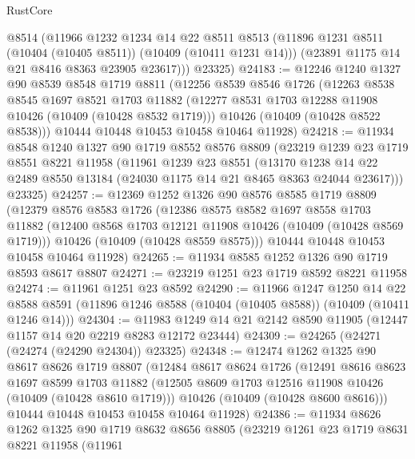 \begin{lexlean}{RustCore}
\begin{coremodule}
        @8514
        (@11966
          @1232
          @1234
          @14
          @22
          @8511
          @8513
          (@11896 @1231 @8511 (@10404 (@10405 @8511)) (@10409 (@10411 @1231 @14)))
          (@23891 @1175 @14 @21 @8416 @8363 @23905 @23617)))
      @23325)
@24183 := @12246
    @1240
    @1327
    @90
    @8539
    @8548
    @1719
    @8811
    (@12256
      @8539
      @8546
      @1726
      (@12263
        @8538
        @8545
        @1697
        @8521
        @1703
        @11882
        (@12277 @8531 @1703 @12288 @11908 @10426 (@10409 (@10428 @8532 @1719)))
        @10426
        (@10409 (@10428 @8522 @8538)))
      @10444
      @10448
      @10453
      @10458
      @10464
      @11928)
@24218 := @11934
    @8548
    @1240
    @1327
    @90
    @1719
    @8552
    @8576
    @8809
    (@23219
      @1239
      @23
      @1719
      @8551
      @8221
      @11958
      (@11961
        @1239
        @23
        @8551
        (@13170 @1238 @14 @22 @2489 @8550 @13184 (@24030 @1175 @14 @21 @8465 @8363 @24044 @23617)))
      @23325)
@24257 := @12369
    @1252
    @1326
    @90
    @8576
    @8585
    @1719
    @8809
    (@12379
      @8576
      @8583
      @1726
      (@12386
        @8575
        @8582
        @1697
        @8558
        @1703
        @11882
        (@12400 @8568 @1703 @12121 @11908 @10426 (@10409 (@10428 @8569 @1719)))
        @10426
        (@10409 (@10428 @8559 @8575)))
      @10444
      @10448
      @10453
      @10458
      @10464
      @11928)
@24265 := @11934 @8585 @1252 @1326 @90 @1719 @8593 @8617 @8807
@24271 := @23219 @1251 @23 @1719 @8592 @8221 @11958
@24274 := @11961 @1251 @23 @8592
@24290 := @11966
    @1247
    @1250
    @14
    @22
    @8588
    @8591
    (@11896 @1246 @8588 (@10404 (@10405 @8588)) (@10409 (@10411 @1246 @14)))
@24304 := @11983 @1249 @14 @21 @2142 @8590 @11905 (@12447 @1157 @14 @20 @2219 @8283 @12172 @23444)
@24309 := @24265 (@24271 (@24274 (@24290 @24304)) @23325)
@24348 := @12474
    @1262
    @1325
    @90
    @8617
    @8626
    @1719
    @8807
    (@12484
      @8617
      @8624
      @1726
      (@12491
        @8616
        @8623
        @1697
        @8599
        @1703
        @11882
        (@12505 @8609 @1703 @12516 @11908 @10426 (@10409 (@10428 @8610 @1719)))
        @10426
        (@10409 (@10428 @8600 @8616)))
      @10444
      @10448
      @10453
      @10458
      @10464
      @11928)
@24386 := @11934
    @8626
    @1262
    @1325
    @90
    @1719
    @8632
    @8656
    @8805
    (@23219
      @1261
      @23
      @1719
      @8631
      @8221
      @11958
      (@11961

\end{coremodule}
\end{lexlean}
